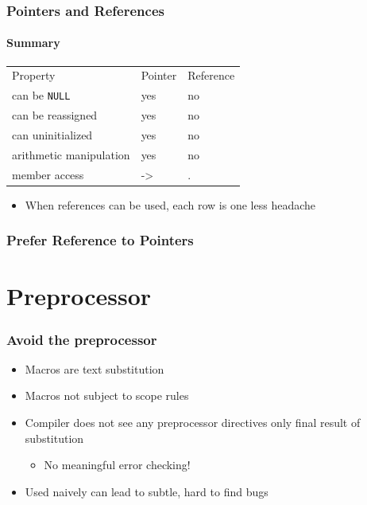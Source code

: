 \documentclass[table]{beamer}
\newcounter{rulecount}
\newcommand{\declarerule}{\textbf{\color{themeblue}{Rule \therulecount:}} }
\newcommand{\declarelesson}{\textbf{\color{themegreen}{Lesson:}} }
\begin{document}
\begin{frame}
    \frametitle{\declarelesson Pointers and References}
    \framesubtitle{Summary}

    \begin{table}[tl]
        \begin{tabular}{p{4.5cm}p{2.5cm}p{2.5cm}}
            \rowcolor{codebg}
            \color{white} Property & \color{white} Pointer & \color{white}  Reference \\
              can be \texttt{NULL} & yes & no \\
                 can be reassigned & yes & no \\
                 can uninitialized & yes & no \\
           arithmetic manipulation & yes & no \\
                     member access & -> & . \\
        \end{tabular}
    \end{table}
    \begin{itemize}
        \item When references can be used, each row is one less headache
    \end{itemize}
\end{frame}

\begin{frame}
    \frametitle{\declarerule Prefer Reference to Pointers}

\end{frame}



\section{Preprocessor}
\frame{\sectionpage}

\begin{frame}
    \frametitle{\declarerule Avoid the preprocessor}
    \begin{itemize}
        \item Macros are text substitution
        \item Macros not subject to scope rules
        \item Compiler does not see any preprocessor directives only final result of substitution
            \begin{itemize}
                \item No meaningful error checking!
            \end{itemize}
        \item Used naively can lead to subtle, hard to find bugs
    \end{itemize}
\end{frame}
\end{document}
